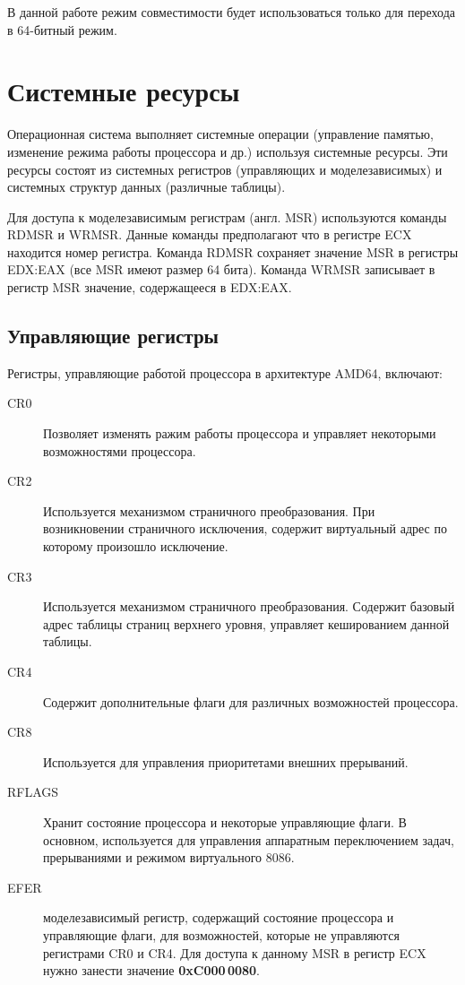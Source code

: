 В данной работе режим совместимости будет использоваться только для перехода
в 64-битный режим.


\section{Системные ресурсы}
Операционная система выполняет системные операции (управление памятью, изменение режима работы процессора и др.)
используя системные ресурсы. Эти ресурсы состоят из системных регистров (управляющих и моделезависимых)
и системных структур данных (различные таблицы).

Для доступа к моделезависимым регистрам (англ. MSR) используются команды RDMSR и WRMSR.
Данные команды предполагают что в регистре ECX находится номер регистра. Команда RDMSR
сохраняет значение MSR в регистры EDX:EAX (все MSR имеют размер 64 бита). Команда WRMSR
записывает в регистр MSR значение, содержащееся в EDX:EAX.

\subsection*{Управляющие регистры}
Регистры, управляющие работой процессора в архитектуре AMD64, включают:
\begin{description}
	\item[CR0] Позволяет изменять ражим работы процессора и управляет некоторыми возможностями процессора.
	\item[CR2] Используется механизмом страничного преобразования. При возникновении страничного исключения, содержит
		виртуальный адрес по которому произошло исключение.
	\item[CR3] Используется механизмом страничного преобразования. Содержит базовый адрес таблицы страниц верхнего
		уровня, управляет кешированием данной таблицы.
	\item[CR4] Содержит дополнительные флаги для различных возможностей процессора.
	\item[CR8] Используется для управления приоритетами внешних прерываний.
	\item[RFLAGS] Хранит состояние процессора и некоторые управляющие флаги. В основном, используется для
		управления аппаратным переключением задач, прерываниями и режимом виртуального 8086.
	\item[EFER] моделезависимый регистр, содержащий состояние процессора и управляющие флаги, для
		возможностей, которые не управляются регистрами CR0 и CR4. Для доступа к данному MSR в регистр
		ECX нужно занести значение \textbf{0xC000\,0080}.
\end{description}

